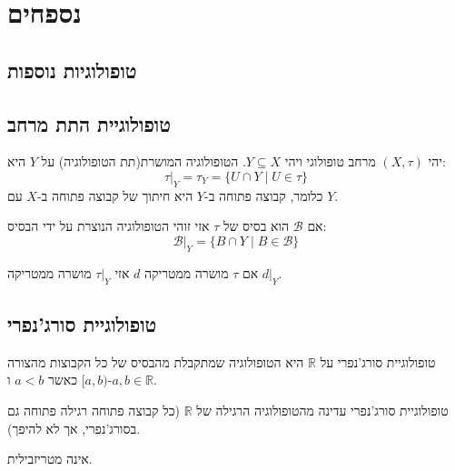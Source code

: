 \documentclass{tstextbook}
\begin{document}
\chapter{נספחים}

\section{טופולוגיות נוספות}

\section{טופולוגיית התת מרחב}

\begin{definition}
יהי \(\left( X,\tau \right)\) מרחב טופולוגי ויהי \(Y\subseteq X\). הטופולוגיה המושרת(תת הטופולוגיה) על \(Y\) היא:
$$\tau|_Y = \tau_Y = \{ U \cap Y \mid U \in \tau \}$$
כלומר, קבוצה פתוחה ב-\(Y\) היא חיתוך של קבוצה פתוחה ב-\(X\) עם \(Y\).

\end{definition}
\begin{proposition}
אם \(\mathcal{B}\) הוא בסיס של \(\tau\) אזי זוהי הטופולוגיה הנוצרת על ידי הבסיס:
$$\mathcal{B}|_{Y}=\{ B\cap Y\mid B \in \mathcal{B} \}$$

\end{proposition}
\begin{proposition}
אם \(\tau\) מושרה ממטריקה \(d\) אזי \(\tau|_{Y}\) מושרה ממטריקה \(d|_{Y}\).

\end{proposition}
\section{טופולוגיית סורג'נפרי}

\begin{definition}
טופולוגיית סורג'נפרי על \(\mathbb{R}\) היא הטופולוגיה שמתקבלת מהבסיס של כל הקבוצות מהצורה \([a, b)\) כאשר \(a < b\) ו-\(a, b \in \mathbb{R}\).

\end{definition}
\begin{proposition}
טופולוגיית סורג'נפרי עדינה מהטופולוגיה הרגילה של \(\mathbb{R}\) (כל קבוצה פתוחה רגילה פתוחה גם בסורג'נפרי, אך לא להיפך).

\end{proposition}
\begin{proposition}
אינה מטריזבילית.

\end{proposition}
\end{document}
